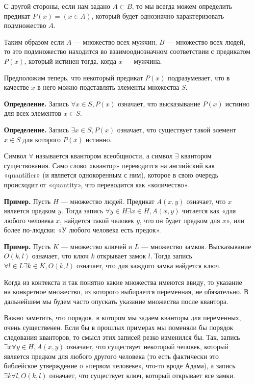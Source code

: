 С другой стороны, если нам задано $A \subset B$, то мы всегда можем определить предикат $P(x) = (x\in A)$, который будет однозначно характеризовать подмножество $A$.

Таким образом если $A$ — множество всех мужчин, $B$ — множество всех людей, то это подмножество находится во взаимооднозначном соответствии с предикатом $P(x)$, который истинен тогда, когда $x$ — мужчина.

Предположим теперь, что некоторый предикат $P(x)$ подразумевает, что в качестве $x$ в него можно подставлять элементы множества $S$.

{\bfseries Определение.} Запись $\forall x\in S, P(x)$ означает, что высказывание $P(x)$ истинно для всех элементов $x \in S$.

{\bfseries Определение.} Запись $\exists x\in S, P(x)$ означает, что существует такой элемент $x\in S$ для которого $P(x)$ истинно.

Символ $\forall$ называется квантором всеобщности, а символ $\exists$ квантором существования.  Само слово «квантор» переводится на английский как «quantifier» (и является однокоренным с ним), которое в свою очередь происходит от «quantity», что переводится как «количество».

{\bfseries Пример.} Пусть $H$ — множество людей. Предикат $A(x, y)$ означает, что $x$ является предком $y$. Тогда запись $\forall y\in H \exists x \in H, A(x, y)$ читается как «для любого человека $x$, найдется такой человек $y$, что он будет предком для $x$», или более по-людски: «У любого человека есть предок».

{\bfseries Пример.} Пусть $K$ — множество ключей и $L$ — множество замков. Высказывание $O(k, l)$ означает, что ключ $k$ открывает замок $l$. Тогда запись $\forall l\in L \exists k \in K, O(k, l)$ означает, что для каждого замка найдется ключ.

Когда из контекста и так понятно какие множества имеются ввиду, то указание на конкретное множество, из которого выбирается переменная, не обязательно. В дальнейшем мы будем часто опускать указание множества после квантора.

Важно заметить, что порядок, в котором мы задаем кванторы для переменных, очень существенен. Если бы в прошлых примерах мы поменяли бы порядок следования кванторов, то смысл этих записей резко изменился бы. Так, запись $\exists x \forall y \in H, A(x, y)$ означает, что существует некоторый человек, который является предком для любого другого человека (то есть фактически это библейское утверждение о «первом человеке», что-то вроде Адама), а запись $\exists k \forall l, O(k, l)$ означает, что существует ключ, который открывает все замки.

